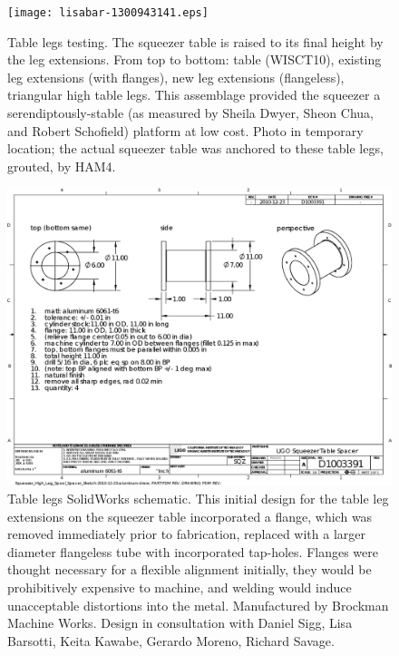 \begin{figure}
\begin{center}
\texttt{[image: lisabar-1300943141.eps]}
\caption{Table legs testing. The squeezer table is raised to its final height by the leg extensions. From top to bottom: table (WISCT10), existing leg extensions (with flanges), new leg extensions (flangeless), triangular high table legs. This assemblage provided the squeezer a serendiptously-stable (as measured by Sheila Dwyer, Sheon Chua, and Robert Schofield) platform at low cost. Photo in temporary location; the actual squeezer table was anchored to these table legs, grouted, by HAM4.
}
\label{table_leg_testing}
\end{center}
\end{figure}




\begin{figure}
\begin{center}
\includegraphics[width=0.6\paperwidth]{Squeezer_High_Leg_Spool_Spacer_2010-12-23_aluminum.eps}
\caption{Table legs SolidWorks schematic. This initial design for the table leg extensions on the squeezer table incorporated a flange, which was removed immediately prior to fabrication, replaced with a larger diameter flangeless tube with incorporated tap-holes. Flanges were thought necessary for a flexible alignment initially, they would be prohibitively expensive to machine, and welding would induce unacceptable distortions into the metal. Manufactured by Brockman Machine Works. Design in consultation with Daniel Sigg, Lisa Barsotti, Keita Kawabe, Gerardo Moreno, Richard Savage.
}
\label{spacer_legs_figure}
\end{center}
\end{figure}


